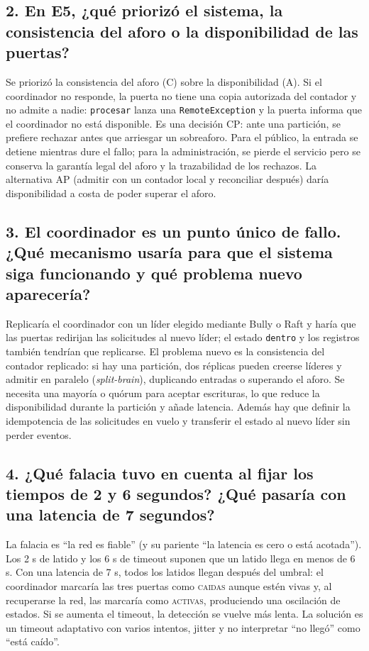 \documentclass[10pt]{article}
\newcommand{\cod}[1]{\texttt{#1}}
\begin{document}
\subsection*{2. En E5, ¿qué priorizó el sistema, la consistencia del aforo o la disponibilidad de las puertas?}

Se priorizó la consistencia del aforo (C) sobre la disponibilidad (A). Si el
coordinador no responde, la puerta no tiene una copia autorizada del contador
y no admite a nadie: \cod{procesar} lanza una \cod{RemoteException} y la puerta
informa que el coordinador no está disponible. Es una decisión CP: ante una
partición, se prefiere rechazar antes que arriesgar un sobreaforo. Para el
público, la entrada se detiene mientras dure el fallo; para la administración,
se pierde el servicio pero se conserva la garantía legal del aforo y la
trazabilidad de los rechazos. La alternativa AP (admitir con un contador local
y reconciliar después) daría disponibilidad a costa de poder superar el aforo.

\subsection*{3. El coordinador es un punto único de fallo. ¿Qué mecanismo usaría para que el sistema siga funcionando y qué problema nuevo aparecería?}

Replicaría el coordinador con un líder elegido mediante Bully o Raft y haría
que las puertas redirijan las solicitudes al nuevo líder; el estado
\cod{dentro} y los registros también tendrían que replicarse. El problema
nuevo es la consistencia del contador replicado: si hay una partición, dos
réplicas pueden creerse líderes y admitir en paralelo (\emph{split-brain}),
duplicando entradas o superando el aforo. Se necesita una mayoría o quórum para
aceptar escrituras, lo que reduce la disponibilidad durante la partición y
añade latencia. Además hay que definir la idempotencia de las solicitudes en
vuelo y transferir el estado al nuevo líder sin perder eventos.

\subsection*{4. ¿Qué falacia tuvo en cuenta al fijar los tiempos de 2 y 6 segundos? ¿Qué pasaría con una latencia de 7 segundos?}

La falacia es ``la red es fiable'' (y su pariente ``la latencia es cero o está
acotada''). Los 2 s de latido y los 6 s de timeout suponen que un latido llega
en menos de 6 s. Con una latencia de 7 s, todos los latidos llegan después del
umbral: el coordinador marcaría las tres puertas como \textsc{caidas} aunque
estén vivas y, al recuperarse la red, las marcaría como \textsc{activas},
produciendo una oscilación de estados. Si se aumenta el timeout, la detección
se vuelve más lenta. La solución es un timeout adaptativo con varios intentos,
jitter y no interpretar ``no llegó'' como ``está caído''.
\end{document}
